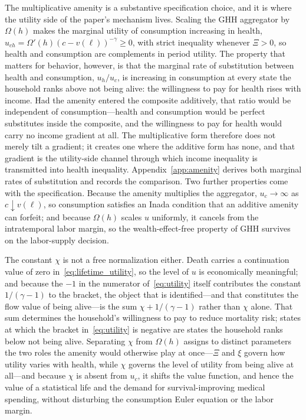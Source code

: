 \documentclass[12pt,a4paper]{article}
\begin{document}
The multiplicative amenity is a substantive specification choice, and it is where the utility side of the paper's mechanism lives. Scaling the GHH aggregator by $\Omega(h)$ makes the marginal utility of consumption increasing in health, $u_{ch} = \Omega'(h)(c - v(\ell))^{-\gamma} \geq 0$, with strict inequality whenever $\Xi > 0$, so health and consumption are complements in period utility. The property that matters for behavior, however, is that the marginal rate of substitution between health and consumption, $u_h/u_c$, is increasing in consumption at every state the household ranks above not being alive: the willingness to pay for health rises with income. Had the amenity entered the composite additively, that ratio would be independent of consumption---health and consumption would be perfect substitutes inside the composite, and the willingness to pay for health would carry no income gradient at all. The multiplicative form therefore does not merely tilt a gradient; it creates one where the additive form has none, and that gradient is the utility-side channel through which income inequality is transmitted into health inequality. Appendix~\ref{app:amenity} derives both marginal rates of substitution and records the comparison. Two further properties come with the specification. Because the amenity multiplies the aggregator, $u_c \to \infty$ as $c \downarrow v(\ell)$, so consumption satisfies an Inada condition that an additive amenity can forfeit; and because $\Omega(h)$ scales $u$ uniformly, it cancels from the intratemporal labor margin, so the wealth-effect-free property of GHH survives on the labor-supply decision.

The constant $\chi$ is not a free normalization either. Death carries a continuation value of zero in~\eqref{eq:lifetime_utility}, so the level of $u$ is economically meaningful; and because the $-1$ in the numerator of~\eqref{eq:utility} itself contributes the constant $1/(\gamma-1)$ to the bracket, the object that is identified---and that constitutes the flow value of being alive---is the sum $\chi + 1/(\gamma-1)$ rather than $\chi$ alone. That sum determines the household's willingness to pay to reduce mortality risk; states at which the bracket in~\eqref{eq:utility} is negative are states the household ranks below not being alive. Separating $\chi$ from $\Omega(h)$ assigns to distinct parameters the two roles the amenity would otherwise play at once---$\Xi$ and $\xi$ govern how utility varies with health, while $\chi$ governs the level of utility from being alive at all---and because $\chi$ is absent from $u_c$, it shifts the value function, and hence the value of a statistical life and the demand for survival-improving medical spending, without disturbing the consumption Euler equation or the labor margin.
\end{document}
